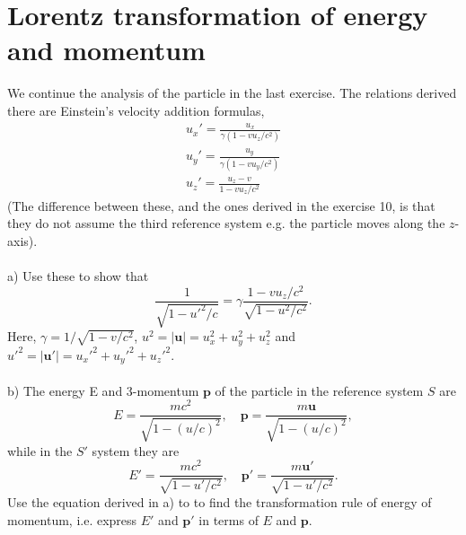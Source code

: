 \documentclass{article}
\begin{document}
    \section{Lorentz transformation of energy and momentum}
    We continue the analysis of the particle in the last exercise. The relations derived there are Einstein's velocity addition formulas,
    \begin{align*}
        u_x' = \frac{u_x}{\gamma(1 - v u_z/c^2)} \\
        u_y' = \frac{u_y}{\gamma(1 - v u_y/c^2)} \\
        u_z' = \frac{u_z - v}{1 - v u_z/c^2}
    \end{align*}
    (The difference between these, and the ones derived in the exercise 10, is that they do not assume the third reference system e.g. the particle moves along the $z$-axis). \\ \\
    a) Use these to show that
    \begin{equation*}
        \frac{1}{\sqrt{1 - u'^2/c}} = \gamma \frac{1 - v u_z / c^2}{\sqrt{1 - u^2/c^2}}.
    \end{equation*}
    Here, $\gamma = 1 / \sqrt{1 - v/c^2}$, $u^2= |\mathbf{u}| = u_x^2 + u_y^2 + u_z^2$ and $u'^2= |\mathbf{u}'|= u_x'^2 + u_y'^2 + u_z'^2$. \\ \\
    b) The energy E and 3-momentum $\mathbf{p}$ of the particle in the reference system $S$ are
    \begin{equation*}
        E = \frac{mc^2}{\sqrt{1 - (u/c)^2}}, \quad \mathbf{p} =\frac{m\mathbf{u}}{\sqrt{1 - (u/c)^2}},
    \end{equation*}
    while in the $S'$ system they are
    \begin{equation*}
        E' = \frac{mc^2}{\sqrt{1 - u'/c^2}}, \quad \mathbf{p'} =\frac{m\mathbf{u'}}{\sqrt{1 - u'/c^2}}.
    \end{equation*}
    Use the equation derived in a) to to find the transformation rule of energy of momentum, i.e. express $E'$ and $\mathbf{p}'$ in terms of $E$ and $\mathbf{p}$.
\end{document}
